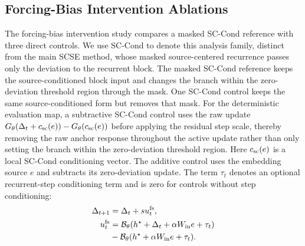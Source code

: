 \documentclass[letterpaper]{article} %
\newcommand{\SCSE}{\textsc{SCSE}}
\newcommand{\Block}{\mathcal{B}}
\theoremstyle{remark}
\begin{document}
\subsection{Forcing-Bias Intervention Ablations}
\label{sec:causal-forcing-ablation}

The forcing-bias intervention study compares a masked SC-Cond reference with three direct controls.  We use SC-Cond to denote this analysis family, distinct from the main \SCSE{} method, whose masked source-centered recurrence passes only the deviation to the recurrent block.  The masked SC-Cond reference keeps the source-conditioned block input and changes the branch within the zero-deviation threshold region through the mask.  One SC-Cond control keeps the same source-conditioned form but removes that mask.  For the deterministic evaluation map, a subtractive SC-Cond control uses the raw update $G_\theta(\Delta_t+c_{\rm sc}(e))-G_\theta(c_{\rm sc}(e))$ before applying the residual step scale, thereby removing the raw anchor response throughout the active update rather than only setting the branch within the zero-deviation threshold region.  Here $c_{\rm sc}(e)$ is a local SC-Cond conditioning vector.  The additive control uses the embedding source $e$ and subtracts its zero-deviation update.  The term $\tau_t$ denotes an optional recurrent-step conditioning term and is zero for controls without step conditioning:
\begin{align}
	\Delta_{t+1}
	 & =
	\Delta_t + s u_t^{\mathrm{fs}},\notag \\
	u_t^{\mathrm{fs}}
	 & =
	\Block_\theta(h^\star+\Delta_t+\alpha W_{\rm in}e+\tau_t)
	\notag                                \\
	 & -
	\Block_\theta(h^\star+\alpha W_{\rm in}e+\tau_t).
	\label{eq:additive-forcing-subtraction}
\end{align}
\end{document}
